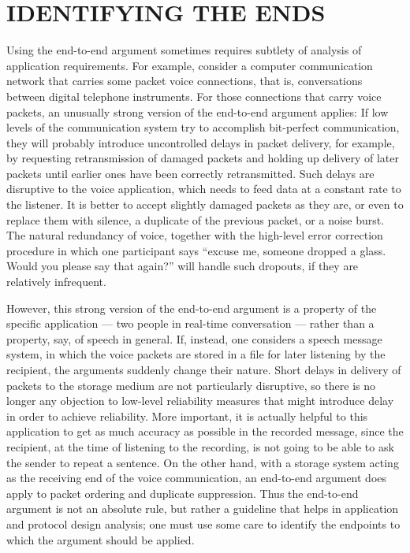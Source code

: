 \documentclass[a4paper,12pt,notitlepage,twoside,openright]{article}
\begin{document}
\hypertarget{identifying-the-ends}{%
\section{IDENTIFYING THE ENDS}\label{identifying-the-ends}}

Using the end-to-end argument sometimes requires subtlety of analysis of
application requirements. For example, consider a computer
communication network that carries some packet voice connections, that
is, conversations between digital telephone instruments. For those
connections that carry voice packets, an unusually strong version of
the end-to-end argument applies: If low levels of the communication
system try to accomplish bit-perfect communication, they will probably
introduce uncontrolled delays in packet delivery, for example, by requesting retransmission of damaged packets and holding up delivery of
later packets until earlier ones have been correctly retransmitted. Such
delays are disruptive to the voice application, which needs to feed data
at a constant rate to the listener. It is better to accept slightly
damaged packets as they are, or even to replace them with silence, a
duplicate of the previous packet, or a noise burst. The natural
redundancy of voice, together with the high-level error correction
procedure in which one participant says ``excuse me, someone dropped a
glass. Would you please say that again?'' will handle such dropouts, if
they are relatively infrequent.

However, this strong version of the end-to-end argument is a property of
the specific application --- two people in real-time conversation ---
rather than a property, say, of speech in general. If, instead, one
considers a speech message system, in which the voice packets are stored
in a file for later listening by the recipient, the arguments suddenly
change their nature. Short delays in delivery of packets to the storage
medium are not particularly disruptive, so there is no longer any
objection to low-level reliability measures that might introduce delay
in order to achieve reliability. More important, it is actually helpful
to this application to get as much accuracy as possible in the recorded
message, since the recipient, at the time of listening to the recording,
is not going to be able to ask the sender to repeat a sentence. On the
other hand, with a storage system acting as the receiving end of the
voice communication, an end-to-end argument does apply to packet
ordering and duplicate suppression. Thus the end-to-end argument is not
an absolute rule, but rather a guideline that helps in application and
protocol design analysis; one must use some care to identify the
endpoints to which the argument should be applied.
\end{document}
